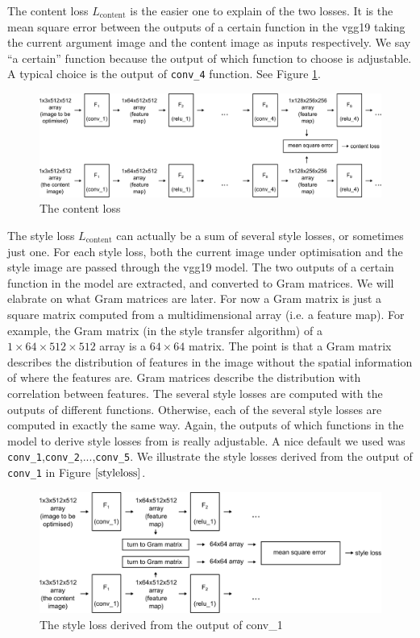 \documentclass[runningheads]{llncs}
\begin{document}
The content loss $L_\text{content}$ is the easier one to explain of the two losses.
It is the mean square error between the outputs of a certain function in the
vgg19 taking the current argument image and the content image as inputs respectively.
We say ``a certain'' function because the output of which function to choose is
adjustable.
A typical choice is the output of \verb|conv_4| function. See Figure \ref{contentloss}.
\begin{figure}
\center
\includegraphics[width=\textwidth]{contentloss.pdf}
\caption{The content loss \label{contentloss}}
\end{figure}


The style loss $L_\text{content}$ can actually be a sum of several style losses, or sometimes just one.
For each style loss, 
both the current image under optimisation and the style image are passed through the vgg19 model.
The two outputs of a certain function in the model are extracted, 
and converted to Gram matrices. We will elabrate on what Gram matrices are later.
For now a Gram matrix is just a square matrix computed from a multidimensional array (i.e. a feature map).
For example, the Gram matrix (in the style transfer algorithm) of a $1\times64\times512\times512$ array
is a $64\times64$ matrix.
The point is that a Gram matrix describes the distribution of features
in the image without the spatial information of where the features are.
Gram matrices describe the distribution with correlation between features.
The several style losses are computed with the outputs of different functions.
Otherwise, each of the several style losses are computed in exactly the same way.
Again, the outputs of which functions in the model to derive style losses from is really adjustable.
A nice default we used was \verb|conv_1|,\verb|conv_2|,...,\verb|conv_5|. We illustrate
the style losses derived from the output of \verb|conv_1| in Figure $\ref{styleloss}$.

\begin{figure}
\center
\includegraphics[width=\textwidth]{styleloss.pdf}
\caption{The style loss derived from the output of conv\_1 \label{styleloss}}
\end{figure}
\end{document}

